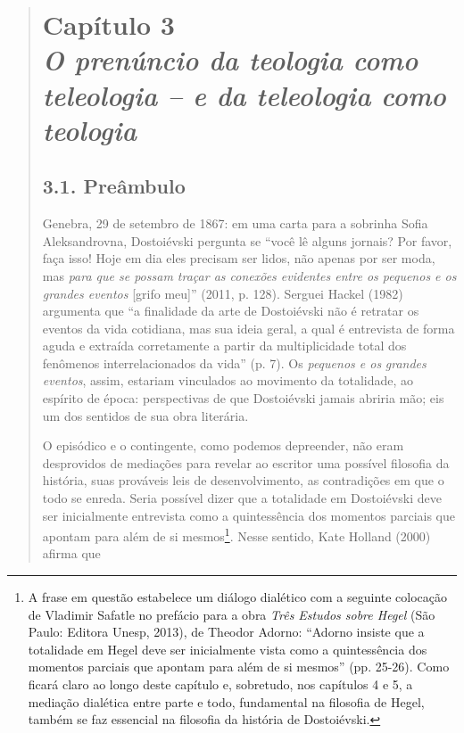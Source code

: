 {\begin{quote}
\thispagestyle{empty}

\chapter*{Capítulo 3\\
\bigskip
\emph{O prenúncio da teologia como teleologia -- e da teleologia como teologia}}


\section{3.1. Preâmbulo}

Genebra, 29 de setembro de 1867: em uma carta para a sobrinha Sofia
Aleksandrovna, Dostoiévski pergunta se ``você lê alguns jornais? Por
favor, faça isso! Hoje em dia eles precisam ser lidos, não apenas por
ser moda, mas \emph{para que se possam traçar as conexões evidentes
entre os pequenos e os grandes eventos} {[}grifo meu{]}'' (2011, p.
128). Serguei Hackel (1982) argumenta que ``a finalidade da arte de
Dostoiévski não é retratar os eventos da vida cotidiana, mas sua ideia
geral, a qual é entrevista de forma aguda e extraída corretamente a
partir da multiplicidade total dos fenômenos interrelacionados da vida''
(p. 7). Os \emph{pequenos e os} \emph{grandes eventos}, assim, estariam
vinculados ao movimento da totalidade, ao espírito de época:
perspectivas de que Dostoiévski jamais abriria mão; eis um dos sentidos
de sua obra literária.

O episódico e o contingente, como podemos depreender, não eram
desprovidos de mediações para revelar ao escritor uma possível filosofia
da história, suas prováveis leis de desenvolvimento, as contradições em
que o todo se enreda. Seria possível dizer que a totalidade em
Dostoiévski deve ser inicialmente entrevista como a quintessência dos
momentos parciais que apontam para além de si mesmos\footnote{A frase em
  questão estabelece um diálogo dialético com a seguinte colocação de
  Vladimir Safatle no prefácio para a obra \emph{Três Estudos sobre
  Hegel} (São Paulo: Editora Unesp, 2013), de Theodor Adorno: ``Adorno
  insiste que a totalidade em Hegel deve ser inicialmente vista como a
  quintessência dos momentos parciais que apontam para além de si
  mesmos'' (pp. 25-26). Como ficará claro ao longo deste capítulo e,
  sobretudo, nos capítulos 4 e 5, a mediação dialética entre parte e
  todo, fundamental na filosofia de Hegel, também se faz essencial na
  filosofia da história de Dostoiévski.}. Nesse sentido, Kate Holland
(2000) afirma que


\end{quote}}
